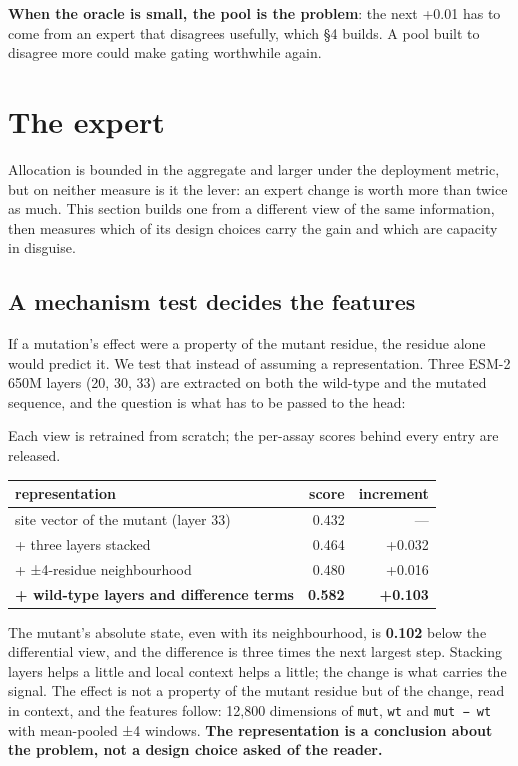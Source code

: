 \documentclass{article}
\begin{document}
\textbf{When the oracle is small, the pool is the problem}: the next +0.01 has to come from an expert that disagrees
usefully, which §4 builds. A pool built to disagree more could make gating worthwhile again.

\section{The expert}\label{the-expert}

Allocation is bounded in the aggregate and larger under the deployment metric, but on neither measure is it the
lever: an expert change is worth more than twice as much. This section builds one from a different view of the
same information, then measures which of its design choices carry the gain and which are capacity in disguise.

\subsection{A mechanism test decides the features}\label{a-mechanism-test-decides-the-features}

If a mutation's effect were a property of the mutant residue, the residue alone would predict it. We test that
instead of assuming a representation. Three ESM-2 650M layers \cite{esm2} (20, 30, 33) are extracted on both the
wild-type and the mutated sequence, and the question is what has to be passed to the head:

Each view is retrained from scratch; the per-assay scores behind every entry are released.

\begin{table}[!t]
\centering
\small
\begin{tabular}{lrr}
\hline
representation & score & increment \\
\hline
site vector of the mutant (layer 33) & 0.432 & --- \\
+ three layers stacked & 0.464 & +0.032 \\
+ ±4-residue neighbourhood & 0.480 & +0.016 \\
\textbf{+ wild-type layers and difference terms} & \textbf{0.582} & \textbf{+0.103} \\
\hline
\end{tabular}
\end{table}

The mutant's absolute state, even with its neighbourhood, is \textbf{0.102} below the differential view, and the
difference is three times the next largest step. Stacking layers helps a little and local context helps a little; the
change is what carries the signal. The effect is not a property of the mutant residue but of the change, read in
context, and the features follow: 12,800 dimensions of \texttt{mut}, \texttt{wt} and \texttt{mut\ −\ wt} with mean-pooled ±4 windows.
\textbf{The representation is a conclusion about the problem, not a design choice asked of the reader.}
\end{document}
